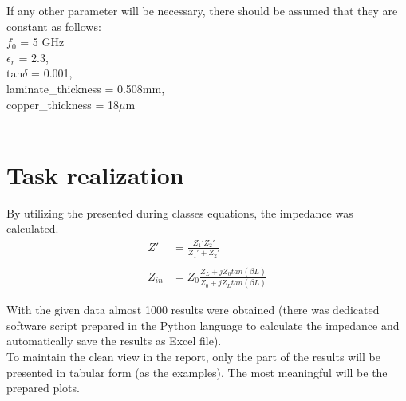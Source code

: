\documentclass[eng,printmode]{mgr}
\begin{document}
If any other parameter will be necessary, there should be assumed that they are constant as follows:\\
$f_0$ = 5 GHz\\
$\epsilon _r$ = 2.3,\\  tan$\delta$ = 0.001, \\laminate\_thickness = 0.508mm, \\copper\_thickness = 18$\mu$m
\\
\\
\section{Task realization}
By utilizing the presented during classes equations, the impedance was calculated.\\
\begin{align*}
Z' &= \frac{Z_1 ' Z_2 '}{Z_1 ' + Z_2 '}\\
\\
Z_{in} &= Z_0 \frac{Z_L + jZ_0tan(\beta L)}{Z_0 + jZ_Ltan(\beta L)}
\end{align*}

\noindent
With the given data almost 1000 results were obtained (there was dedicated software script prepared in the Python language to calculate the impedance and automatically save the results as Excel file).
\\
To maintain the clean view in the report, only the part of the results will be presented in tabular form (as the examples). The most meaningful will be the prepared plots.
\end{document}
